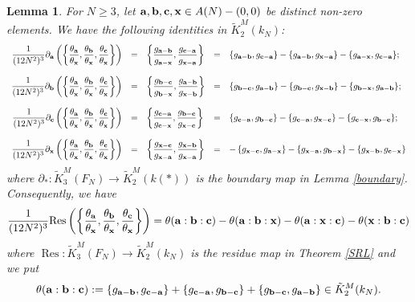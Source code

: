 \documentclass[12pt,amstex,amssymb]{article}
\theoremstyle{plain}
\newtheorem{lemma}[theorem]{Lemma}
\theoremstyle{definition}
\def\C{{\mathbb C}}
\def\bx {{\bf x}}
\newcommand{\Res}{\operatorname{Res}}
\newcommand{\ba}{\mathbf{a}}
\newcommand{\bb}{\mathbf{b}}
\newcommand{\bc}{{\bf c}}
\begin{document}
\begin{lemma} \label{bcomputation}
	For $N\geq 3$, let $\ba,\bb,\bc,\bx \in A(N)-(0,0)$ be distinct non-zero elements. We have the following identities in $\tilde K^M_2(k_N)$:
	$$
	\begin{array}{rclcl} \displaystyle
		\frac{1}{(12N^2)^3} {\partial}_\ba \left( \left\{\frac{\theta_{\ba}}{\theta_\bx},\frac{\theta_{\bb}}{\theta_\bx},\frac{\theta_{\bc}}{\theta_\bx}\right\}\right)
		&=& \displaystyle \left\{ \frac{g_{\ba-\bb}}{g_{\ba-\bx}}, \frac{g_{\bc-\ba}}{g_{\bx-\ba}} \right\} &=& \{g_{\ba-\bb},g_{\bc-\ba}\} - \{g_{\ba - \bb}, g_{\bx-\ba}\}-\{g_{\ba-\bx},g_{\bc-\ba}\} ;\\
		\\
		\displaystyle \frac{1}{(12N^2)^3} {\partial}_\bb \left( \left\{\frac{\theta_{\ba}}{\theta_\bx},\frac{\theta_{\bb}}{\theta_\bx},\frac{\theta_{\bc}}{\theta_\bx}\right\}\right)
		&=& \displaystyle \left\{ \frac{g_{\bb-\bc}}{g_{\bb-\bx}}, \frac{g_{\ba-\bb}}{g_{\bx-\bb}} \right\}
		&=&  \{g_{\bb-\bc}, g_{\ba-\bb}\} - \{g_{\bb-\bc}, g_{\bx-\bb}\} - \{g_{\bb-\bx},g_{\ba-\bb}\} ;\\
		\\
		\displaystyle \frac{1}{(12N^2)^3} {\partial}_\bc \left( \left\{\frac{\theta_{\ba}}{\theta_\bx},\frac{\theta_{\bb}}{\theta_\bx},\frac{\theta_{\bc}}{\theta_\bx}\right\}\right)
		&=&\displaystyle\left\{ \frac{g_{\bc-\ba}}{g_{\bc-\bx}}, \frac{g_{\bb-\bc}}{g_{\bx-\bc}} \right\} 
		&=& \{g_{\bc-\ba},g_{\bb-\bc} \} - \{g_{\bc -\ba},g_{\bx-\bc}\} - \{g_{\bc - \bx}, g_{\bb-\bc}\};\\
		\\
		\displaystyle \frac{1}{(12N^2)^3} {\partial}_\bx \left( \left\{\frac{\theta_{\ba}}{\theta_\bx},\frac{\theta_{\bb}}{\theta_\bx},\frac{\theta_{\bc}}{\theta_\bx}\right\}\right) 
		&=&\displaystyle \left\{ \frac{g_{\bx-\bc}} {g_{\bx-\ba}}, \frac{g_{\bx-\bb}}{g_{\bx-\ba}}\right\}
		&=&-\left\{ g_{\bx-\bc},g_{\ba- \bx}\right\} - \{g_{\bx -\ba}, g_{\bb-\bx}\} - \{ g_{\bx -\bb}, g_{\bc - \bx}\} \\
	\end{array}
	$$
	where $\partial_*: \tilde K^M_3(F_N) \to \tilde K^M_2(k(*))$ is the boundary map in Lemma \ref{boundary}.
	Consequently, we have
	$$
	\frac{1}{(12N^2)^3} {\Res}\left( \left\{\frac{\theta_{\ba}}{\theta_\bx},\frac{\theta_{\bb}}{\theta_\bx},\frac{\theta_{\bc}}{\theta_\bx}\right\}\right) = 
	\theta(\ba:\bb:\bc) - \theta(\ba:\bb:\bx) - \theta(\ba:\bx:\bc) - \theta(\bx:\bb:\bc)
	$$
	where $\Res:\tilde K^M_3(F_N) \to \tilde K^M_2(k_N)$ is the residue map in Theorem \ref{SRL} and we put 
	$$
	\theta(\ba:\bb:\bc) := \{g_{\ba-\bb},g_{\bc-\ba}\} +  \{g_{\bc-\ba},g_{\bb-\bc}\} +  \{g_{\bb-\bc},g_{\ba-\bb}\} \in \tilde K^M_2(k_N).
	$$
	
\end{lemma}
\end{document}
